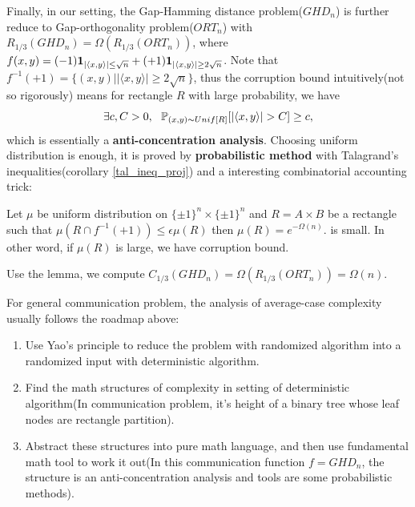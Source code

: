 {Finally, in our setting, the Gap-Hamming distance problem($GHD_n$) is further reduce to Gap-orthogonality problem($ORT_n$) with $R_{1/3}(GHD_n)=\Omega(R_{1/3}(ORT_n))$, where $f(x,y)=(-1)\mathbf{1}_{|\langle x,y \rangle|\le\sqrt{n}}+(+1)\mathbf{1}_{|\langle x,y \rangle|\ge2\sqrt{n}}$. 
Note that $f^{-1}(+1)=\{(x,y)||\langle x,y \rangle|\ge2\sqrt{n}\}$, thus the corruption bound intuitively(not so rigorously) means for rectangle $R$ with large probability, we have
\begin{equation}
    \label{anti_concen_ghd}
    \exists c,C>0,~~\mb P_{(x,y)\sim Unif[R]}[|\langle x,y \rangle|>C]\ge c,
\end{equation}
which is essentially a \textbf{anti-concentration analysis}. Choosing uniform distribution is enough, it is proved by \textbf{probabilistic method} with Talagrand's inequalities(corollary \ref{tal_ineq_proj}) and a interesting combinatorial accounting trick:
\begin{lem}
\label{cor_bound}
Let $\mu$ be uniform distribution on $\{\pm1\}^n\times\{\pm1\}^n$ and $R=A\times B$ be a rectangle such that $\mu(R\cap f^{-1}(+1))\le \epsilon\mu(R)$ then $\mu(R)=e^{-\Omega(n)}.$ is small. In other word, if $\mu(R)$ is large, we have corruption bound.
\end{lem}
\noindent Use the lemma, we compute $C_{1/3}(GHD_n)=\Omega(R_{1/3}(ORT_n))=\Omega(n)$.
}

\begin{rmk}
For general communication problem, the analysis of average-case complexity usually follows the roadmap above:
\begin{enumerate}
    \item Use Yao's principle to reduce the problem with randomized algorithm into a randomized input with deterministic algorithm.
    \item Find the math structures of complexity in setting of deterministic algorithm(In communication problem, it's height of a binary tree whose leaf nodes are rectangle partition).
    \item Abstract these structures into pure math language, and then use fundamental math tool to work it out(In this communication function $f=GHD_n$, the structure is an anti-concentration analysis and tools are some probabilistic methods).
\end{enumerate}
\end{rmk}

